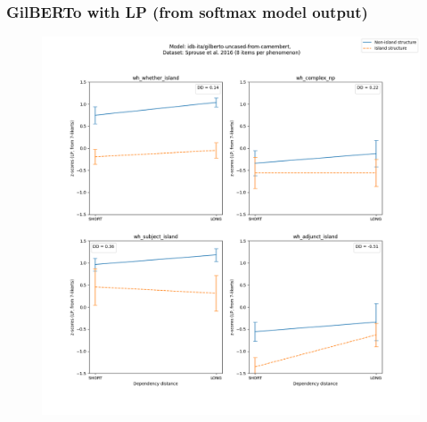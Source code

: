 \subsubsection{GilBERTo with LP (from softmax model output)}
\begin{figure}[h]
	\centering
	\includegraphics[width=1\textwidth]{images/AppendixA/Sprouse_wh_idb-ita_gilberto-uncased-from-camembert_LP-zscores-likert-2022-07-11.png} 
\end{figure}

\clearpage
